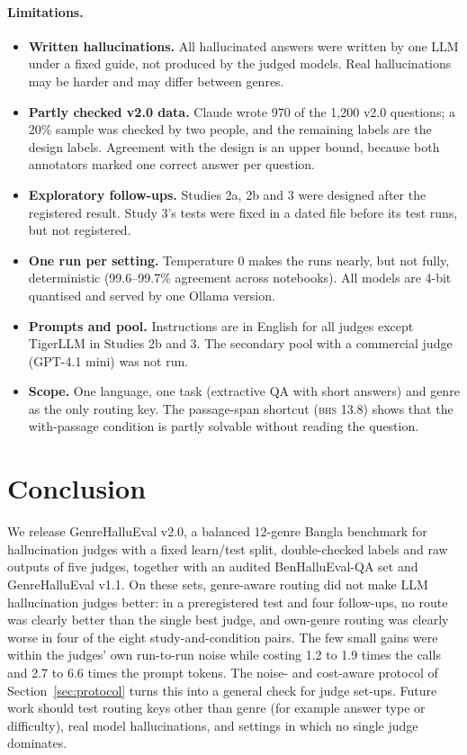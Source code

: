 \documentclass[pdflatex,sn-apa]{sn-jnl}
\newcommand{\BHS}{\textsc{bhs}}
\begin{document}
\paragraph{Limitations.}
\begin{itemize}
  \item \textbf{Written hallucinations.} All hallucinated answers were written by one LLM under a fixed guide, not
  produced by the judged models. Real hallucinations may be harder and may differ between genres.
  \item \textbf{Partly checked v2.0 data.} Claude wrote 970 of the 1,200 v2.0 questions; a 20\% sample was checked by
  two people, and the remaining labels are the design labels. Agreement with the design is an upper bound, because
  both annotators marked one correct answer per question.
  \item \textbf{Exploratory follow-ups.} Studies 2a, 2b and 3 were designed after the registered result. Study 3's
  tests were fixed in a dated file before its test runs, but not registered.
  \item \textbf{One run per setting.} Temperature 0 makes the runs nearly, but not fully, deterministic (99.6--99.7\%
  agreement across notebooks). All models are 4-bit quantised and served by one Ollama version.
  \item \textbf{Prompts and pool.} Instructions are in English for all judges except TigerLLM in Studies 2b and 3.
  The secondary pool with a commercial judge (GPT-4.1 mini) was not run.
  \item \textbf{Scope.} One language, one task (extractive QA with short answers) and genre as the only routing key.
  The passage-span shortcut (\BHS{} 13.8) shows that the with-passage condition is partly solvable without reading the
  question.
\end{itemize}

\section{Conclusion}

We release GenreHalluEval v2.0, a balanced 12-genre Bangla benchmark for hallucination judges with a fixed
learn/test split, double-checked labels and raw outputs of five judges, together with an audited BenHalluEval-QA set
and GenreHalluEval v1.1. On these sets, genre-aware routing did not make LLM hallucination judges better: in a
preregistered test and four follow-ups, no route was clearly better than the single best judge, and own-genre routing
was clearly worse in four of the eight study-and-condition pairs. The few small gains were within the judges' own
run-to-run noise while costing 1.2 to 1.9 times the calls and 2.7 to 6.6 times the prompt tokens. The noise- and
cost-aware protocol of Section~\ref{sec:protocol} turns this into a general check for judge set-ups. Future work should
test routing keys other than genre (for example answer type or difficulty), real model hallucinations, and settings in
which no single judge dominates.
\end{document}
